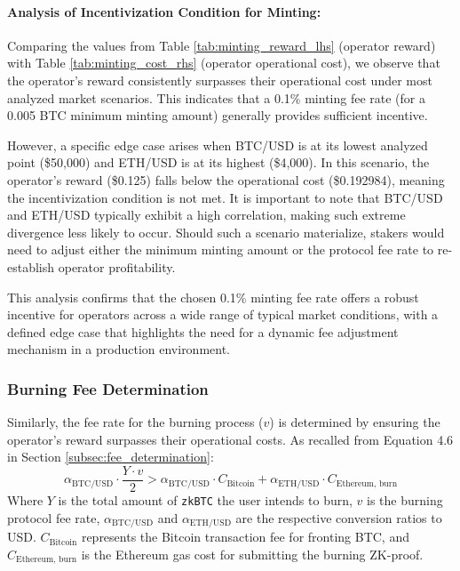 \documentclass{DESSThesis}
\newcommand{\zktoken}{\texttt{zkBTC}}
\begin{document}
\paragraph{Analysis of Incentivization Condition for Minting:}
Comparing the values from Table \ref{tab:minting_reward_lhs} (operator reward) with Table \ref{tab:minting_cost_rhs} (operator operational cost), we observe that the operator's reward consistently surpasses their operational cost under most analyzed market scenarios. This indicates that a 0.1\% minting fee rate (for a 0.005 BTC minimum minting amount) generally provides sufficient incentive.

However, a specific edge case arises when BTC/USD is at its lowest analyzed point (\$50,000) and ETH/USD is at its highest (\$4,000). In this scenario, the operator's reward (\$0.125) falls below the operational cost (\$0.192984), meaning the incentivization condition is not met. It is important to note that BTC/USD and ETH/USD typically exhibit a high correlation, making such extreme divergence less likely to occur. Should such a scenario materialize, stakers would need to adjust either the minimum minting amount or the protocol fee rate to re-establish operator profitability.

This analysis confirms that the chosen 0.1\% minting fee rate offers a robust incentive for operators across a wide range of typical market conditions, with a defined edge case that highlights the need for a dynamic fee adjustment mechanism in a production environment.

\subsubsection{Burning Fee Determination}
Similarly, the fee rate for the burning process (\(v\)) is determined by ensuring the operator's reward surpasses their operational costs. As recalled from Equation 4.6 in Section \ref{subsec:fee_determination}:
\[
\alpha_{\text{BTC/USD}} \cdot \frac{Y \cdot v}{2} > \alpha_{\text{BTC/USD}} \cdot C_{\text{Bitcoin}} + \alpha_{\text{ETH/USD}} \cdot C_{\text{Ethereum, burn}}
\]
Where \(Y\) is the total amount of \texttt{\zktoken} the user intends to burn, \(v\) is the burning protocol fee rate, \(\alpha_{\text{BTC/USD}}\) and \(\alpha_{\text{ETH/USD}}\) are the respective conversion ratios to USD. \(C_{\text{Bitcoin}}\) represents the Bitcoin transaction fee for fronting BTC, and \(C_{\text{Ethereum, burn}}\) is the Ethereum gas cost for submitting the burning ZK-proof.
\end{document}

